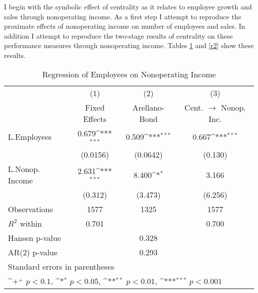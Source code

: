 I begin with the symbolic effect of centrality as it relates to employee growth and sales through nonoperating income. As a first step I attempt to reproduce the proximate effects of nonoperating income on number of employees and sales. In addition I attempt to reproduce the two-stage results of centrality on these performance measures through nonoperating income. Tables \ref{r1} and \ref{r2} show these results.

\begin{table}[htbp]\centering \caption{Regression of Employees on Nonoperating Income\label{r1}}
{
\def\sym#1{\ifmmode^{#1}\else\(^{#1}\)\fi}
\begin{tabular}{l*{3}{c}}
\hline\hline
                    &\multicolumn{1}{c}{(1)}&\multicolumn{1}{c}{(2)}&\multicolumn{1}{c}{(3)}\\
                    &\multicolumn{1}{c}{Fixed Effects}&\multicolumn{1}{c}{Arellano-Bond}&\multicolumn{1}{c}{Cent. $\rightarrow$ Nonop. Inc.}\\
\hline
L.Employees         &       0.679\sym{***}&       0.509\sym{***}&       0.667\sym{***}\\
                    &    (0.0156)         &    (0.0642)         &     (0.130)         \\
L.Nonop. Income     &       2.631\sym{***}&       8.400\sym{*}  &       3.166         \\
                    &     (0.312)         &     (3.473)         &     (6.256)         \\
\hline
Observations        &        1577         &        1325         &        1577         \\
$R^2$ within                &       0.701         &                     &       0.700         \\
Hansen p-value             &                     &       0.328         &                     \\
AR(2) p-value                &                     &       0.293         &                     \\
\hline\hline
\multicolumn{4}{l}{\footnotesize Standard errors in parentheses}\\
\multicolumn{4}{l}{\footnotesize \sym{+} \(p<0.1\), \sym{*} \(p<0.05\), \sym{**} \(p<0.01\), \sym{***} \(p<0.001\)}\\
\end{tabular}
}

\end{table}

